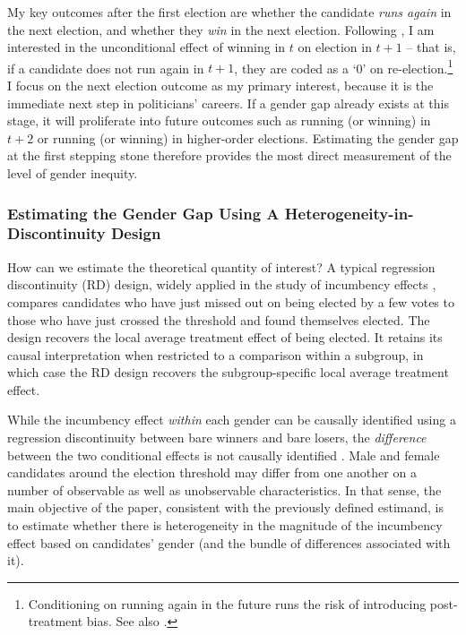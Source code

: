 \documentclass[12pt]{article}
\begin{document}
My key outcomes after the first election are whether the candidate \emph{runs again} in the next election, and whether they \emph{win} in the next election. Following \citet{demagalhaes2015}, I am interested in the unconditional effect of winning in $t$ on election in $t+1$ -- that is, if a candidate does not run again in $t + 1$, they are coded as a `0' on re-election.\footnote{Conditioning on running again in the future runs the risk of introducing post-treatment bias. See also \citet{hyytinen2018a,cirone2020}.} I focus on the next election outcome as my primary interest, because it is the immediate next step in politicians' careers. If a gender gap already exists at this stage, it will proliferate into future outcomes such as running (or winning) in $t + 2$ or running (or winning) in higher-order elections. Estimating the gender gap at the first stepping stone therefore provides the most direct measurement of the level of gender inequity.

\subsubsection{Estimating the Gender Gap Using A Heterogeneity-in-Discontinuity Design}

How can we estimate the theoretical quantity of interest? A typical regression discontinuity (RD) design, widely applied in the study of incumbency effects \citep[e.g.][]{lee2001a,demagalhaes2015,folke2016d}, compares candidates who have just missed out on being elected by a few votes to those who have just crossed the threshold and found themselves elected. The design recovers the local average treatment effect of being elected. It retains its causal interpretation when restricted to a comparison within a subgroup, in which case the RD design recovers the subgroup-specific local average treatment effect.

While the incumbency effect \emph{within} each gender can be causally identified using a regression discontinuity between bare winners and bare losers, the \emph{difference} between the two conditional effects is not causally identified \citep{wasserman2020,brown2019}. Male and female candidates around the election threshold may differ from one another on a number of observable as well as unobservable characteristics. In that sense, the main objective of the paper, consistent with the previously defined estimand, is to estimate whether there is heterogeneity in the magnitude of the incumbency effect based on candidates' gender (and the bundle of differences associated with it).
\end{document}
